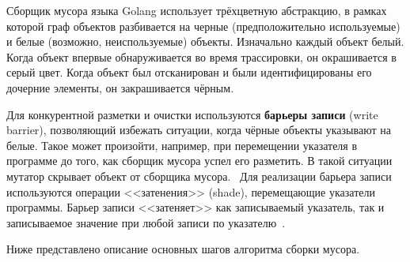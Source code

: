 Сборщик мусора языка Golang использует трёхцветную абстракцию, в рамках которой граф объектов разбивается на черные (предположительно используемые) и белые (возможно, неиспользуемые) объекты. Изначально каждый объект белый. Когда объект впервые обнаруживается во время трассировки, он окрашивается в серый цвет. Когда объект был отсканирован и были идентифицированы его дочерние элементы, он закрашивается чёрным.~\cite{handbook}

Для конкурентной разметки и очистки используются \textbf{барьеры записи} (write barrier), позволяющий избежать ситуации, когда чёрные объекты указывают на белые. Такое может произойти, например, при перемещении указателя в программе до того, как сборщик мусора успел его разметить. В такой ситуации мутатор скрывает объект от сборщика мусора.~\cite{golang_gc} Для реализации барьера записи используются операции <<затенения>> (shade), перемещающие указатели программы. Барьер записи <<затеняет>> как записываемый указатель, так и записываемое значение при любой записи по указателю~\cite{golang_barrier}. 

Ниже представлено описание основных шагов алгоритма сборки мусора.~\cite{golang_gc}

